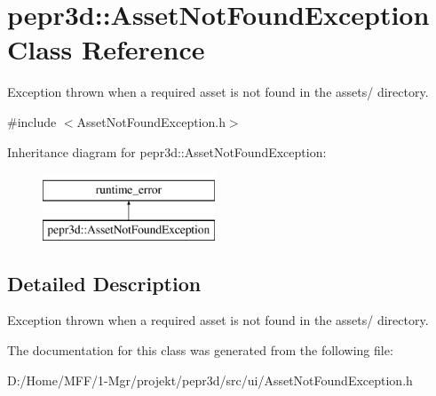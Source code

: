 \hypertarget{classpepr3d_1_1_asset_not_found_exception}{}\section{pepr3d\+::Asset\+Not\+Found\+Exception Class Reference}
\label{classpepr3d_1_1_asset_not_found_exception}


Exception thrown when a required asset is not found in the assets/ directory.  




{\ttfamily \#include $<$Asset\+Not\+Found\+Exception.\+h$>$}

Inheritance diagram for pepr3d\+::Asset\+Not\+Found\+Exception\+:\begin{figure}[H]
\begin{center}
\leavevmode
\includegraphics[height=2.000000cm]{classpepr3d_1_1_asset_not_found_exception}
\end{center}
\end{figure}


\subsection{Detailed Description}
Exception thrown when a required asset is not found in the assets/ directory. 

The documentation for this class was generated from the following file\+:\begin{DoxyCompactItemize}
\item 
D\+:/\+Home/\+M\+F\+F/1-\/\+Mgr/projekt/pepr3d/src/ui/Asset\+Not\+Found\+Exception.\+h\end{DoxyCompactItemize}
